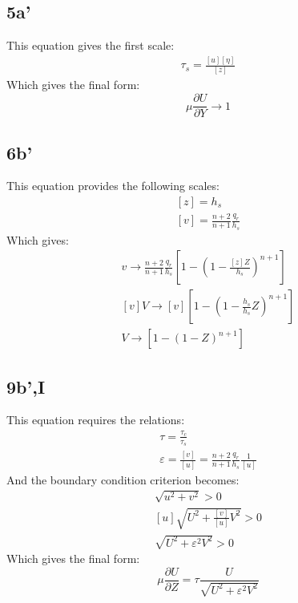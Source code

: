 \documentclass[10pt, letterpaper, twoside]{article}
\newcommand{\pd}[2]{\frac{\partial#1}{\partial#2}}
\begin{document}
	\subsection{5a'}
	This equation gives the first scale:
	\begin{gather*}
		\tau_s = \frac{\left[u\right]\left[\eta\right]}{\left[z\right]} \tag{S1}
	\end{gather*}
	Which gives the final form:
	\begin{equation*}
		\mu\pd{U}{Y}\rightarrow 1 \tag{25a}
	\end{equation*}
	\subsection{6b'}
	This equation provides the following scales:
	\begin{gather*}
		\left[z\right] = h_s \tag{S2} \\
		\left[v\right] = \frac{n+2}{n+1}\frac{q_r}{h_s} \tag{S3}
	\end{gather*}
	Which gives:
	\begin{gather*}
		v \rightarrow \frac{n+2}{n+1}\frac{q_r}{h_s}\left[1-\left(1-\frac{\left[z\right]Z}{h_s}\right)^{n+1}\right]\\
		\left[v\right]V \rightarrow \left[v\right]\left[1-\left(1-\frac{h_s}{h_s}Z\right)^{n+1}\right]\\
		V \rightarrow \left[1-\left(1-Z\right)^{n+1}\right] \tag{26b}
	\end{gather*}
	\subsection{9b',I}
	This equation requires the relations:
	\begin{gather*}
		\tau = \frac{\tau_c}{\tau_s} \tag{N1} \\
		\varepsilon = \frac{\left[v\right]}{\left[u\right]} = \frac{n+2}{n+1}\frac{q_r}{h_s}\frac{1}{\left[u\right]} \tag{N2}
	\end{gather*}
	And the boundary condition criterion becomes:
	\begin{gather*}
		\sqrt{u^2+v^2}>0\\
		\left[u\right]\sqrt{U^2+\frac{\left[v\right]}{\left[u\right]}V^2}>0\\
		\sqrt{U^2+\varepsilon^2V^2}>0
	\end{gather*}
	Which gives the final form:
	\begin{equation*}
		\mu\pd{U}{Z} = \tau\frac{U}{\sqrt{U^2+\varepsilon^2V^2}} \tag{30b,I}
	\end{equation*}
\end{document}
